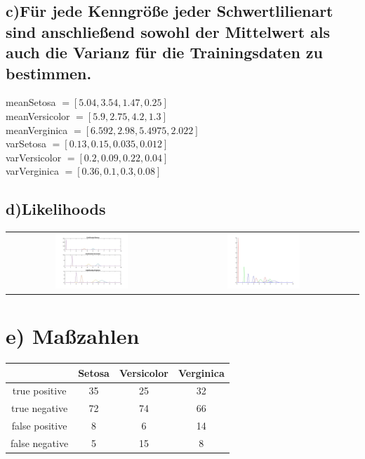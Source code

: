 \documentclass{scrartcl}
\begin{document}
\subsection*{c)Für jede Kenngröße jeder Schwertlilienart sind anschließend sowohl der Mittelwert als auch die Varianz	für die Trainingsdaten zu bestimmen.}
meanSetosa $ = [5.04, 3.54, 1.47, 0.25]$ \\
meanVersicolor  $ = [5.9, 2.75,	4.2, 1.3]$ \\
meanVerginica $ = [6.592, 2.98, 	5.4975, 2.022]$ \\ 

varSetosa $ = [0.13,	0.15,	0.035,	0.012]$ \\
varVersicolor $ = [0.2, 0.09, 0.22, 0.04]$\\
varVerginica $ = [0.36, 0.1, 0.3, 0.08]$ \\
\subsection*{d)Likelihoods}
\begin{tabular}{ccc}
\includegraphics[width=0.45\textwidth]{plots/LikelihoodsAll.jpg} &
\includegraphics[width=0.45\textwidth]{plots/BayesAll.jpg}
\end{tabular}
\section*{e) Maßzahlen}
\begin{tabular}{|c|c|c|c|}
	\hline
	&	Setosa	&	Versicolor	&	Verginica\\ 
	\hline
	true positive  & 35	&25	&32\\
	true negative  & 72	&74	&66\\
	false positive & 8	&6	&14\\
	false negative & 5	&15	&8\\
	\hline
\end{tabular}
\end{document}

